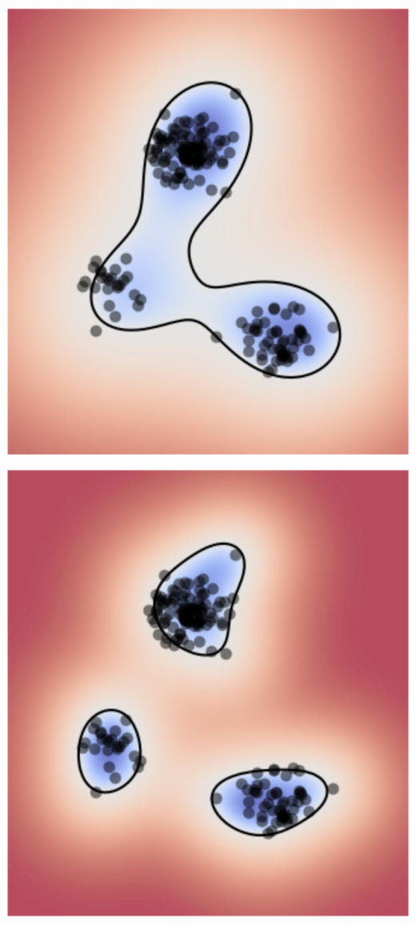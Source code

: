 \documentclass[10pt,aspectratio=169,handout]{beamer}
\begin{document}
\begin{frame}
    \begin{minipage}[t]{0.45\textwidth}
        \includegraphics[width=\textwidth]{images/task-5-5-2-1.png}
    \end{minipage}
    \begin{minipage}[t]{0.45\textwidth}
        \includegraphics[width=\textwidth]{images/task-5-5-2-05.png}
    \end{minipage}
\end{frame}
\end{document}
